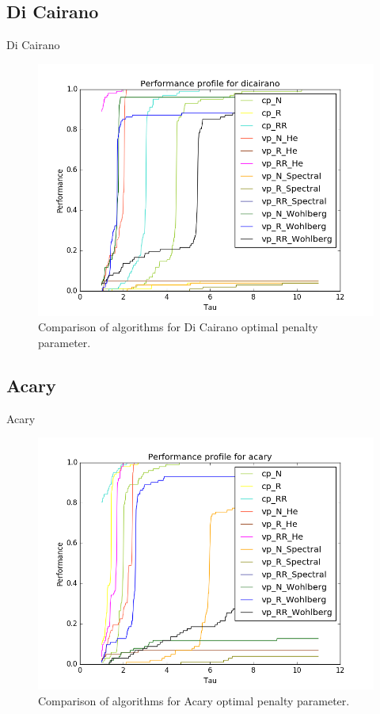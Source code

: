\documentclass[8pt,red]{beamer}
\theoremstyle{plain}
\theoremstyle{definition}
\theoremstyle{remark}
\begin{document}
\subsection{Di Cairano}
\begin{frame}{Di Cairano}
\begin{figure}[hbtp]
\centering
\includegraphics[scale=0.4]{Results/DiCairano_mini.png}
\caption{Comparison of algorithms for Di Cairano optimal penalty parameter.}
\end{figure}
\end{frame}

\subsection{Acary}
\begin{frame}{Acary}
\begin{figure}[hbtp]
\centering
\includegraphics[scale=0.4]{Results/Acary_mini.png}
\caption{Comparison of algorithms for Acary optimal penalty parameter.}
\end{figure}
\end{frame}
\end{document}
